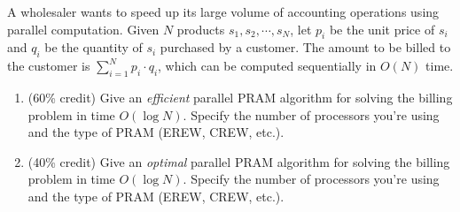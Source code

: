 A wholesaler wants to speed up its large volume of accounting
operations using parallel computation.  Given $N$ products
$s_1,s_2,\cdots,s_N$,  let $p_i$ be the unit price of $s_i$ and $q_i$ be
the quantity of $s_i$ purchased by a customer.  The amount to be billed
to the customer is $\sum_{i=1}^{N} p_i \cdot  q_i$, which can be
computed sequentially in $O(N)$ time.

\begin{enumerate}

\item  (60\%  credit) Give an {\em efficient} parallel PRAM algorithm for
solving the billing problem in time $O(\log  N)$.  Specify the number of
processors you're using and the type of PRAM (EREW, CREW, etc.).

\item  (40\%  credit) Give an {\em optimal} parallel PRAM algorithm for
solving the billing problem in time $O(\log  N)$.  Specify the number of
processors you're using and the type of PRAM (EREW, CREW, etc.).

\end{enumerate}
